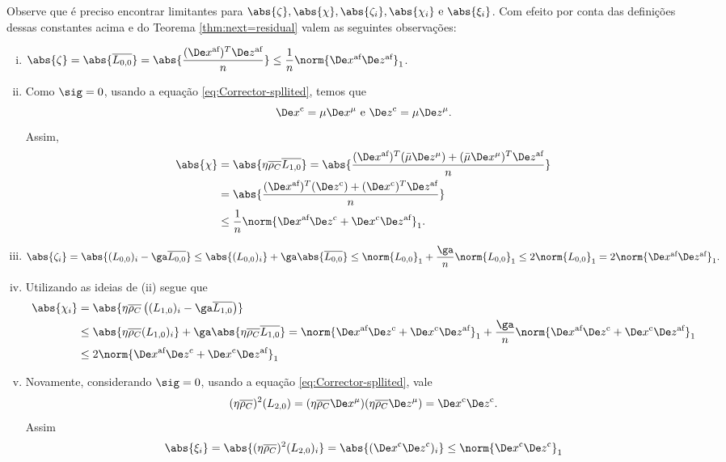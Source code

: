 Observe que é preciso encontrar limitantes para $ \abs{\zeta}, \abs{\chi}, \abs{\zeta_i}, \abs{\chi_i} \text{ e } \abs{\xi_i}$.
Com efeito por conta  das definições dessas constantes acima  e do Teorema \ref{thm:next=residual} valem as seguintes observações:
\begin{enumerate}[(i)]
	\item $\abs{\zeta} = \abs{\dbvec{L_{0,0}}} = \abs{\dfrac{(\dex)^T\dez}{n}} \leq \dfrac{1}{n} \norm{\dex\dez}_1$.
	\item Como $\sig=0$, usando a equação \eqref{eq:Corrector-spllited}, temos que 
	\[
		\Decox = \mu\Dex^\mu \text{ e } \Decoz = \mu\Dez^\mu.
	\]
	Assim,  
	\[
	\begin{aligned}
	\abs{\chi} & = \abs{\eta\dbvec{\rho_C} \dbvec{L_{1,0}}} = \abs{\dfrac{(\dex)^T(\bar{\mu}\Dez^\mu) + (\bar{\mu}\Dex^\mu)^T\dez}{n}   }  \\ 
	&  = \abs{\dfrac{(\dex)^T(\Decoz) + (\Decox)^T\dez}{n} }  \\
	& \leq \dfrac{1}{n} \norm{\dex\Decoz + \Decox\dez}_1.
	\end{aligned}
	\]

\item $\abs{\zeta_i}  = \abs{(L_{0,0})_i - \ga \dbvec{L_{0,0}}} \leq \abs{(L_{0,0})_i} + \ga \abs{\dbvec{L_{0,0}}} \leq
					\norm{L_{0,0}}_1  + \dfrac{\ga}{n}\norm{L_{0,0}}_1 \leq 2\norm{L_{0,0}}_1 = 2\norm{\dex\dez}_1.$
\item Utilizando as ideias de (ii) segue que  
\[
\begin{aligned}
	\abs{\chi_i }  & = \abs{\eta\dbvec{\rho_C} \left( ({L_{1,0}})_i - \ga\dbvec{L_{1,0}} \right)} \\
	&  \leq 
						\abs{\eta\dbvec{\rho_C}  ({L_{1,0}})_i} + \ga\abs { \eta\dbvec{\rho_C}\dbvec{L_{1,0}} } = \norm{\dex\Decoz + \Decox\dez}_1 + \dfrac{\ga}{n}\norm{\dex\Decoz + \Decox\dez}_1	\\
						& \leq 2 \norm{\dex\Decoz + \Decox\dez}_1
\end{aligned}
\]

\item Novamente, considerando $\sig=0$, usando a equação \eqref{eq:Corrector-spllited},  vale
\[
	(\eta\dbvec{\rho_C})^2(L_{2,0}) = (\eta\dbvec{\rho_C}\Dex^\mu)(\eta\dbvec{\rho_C}\Dez^\mu) = \Decox\Decoz.
\]
Assim
\[
	\abs{\xi_i}	 =  \abs{(\eta\dbvec{\rho_C})^2(L_{2,0})_i}  = \abs{(\Decox\Decoz)_i} \leq \norm{\Decox\Decoz}_1
\]

\end{enumerate}

